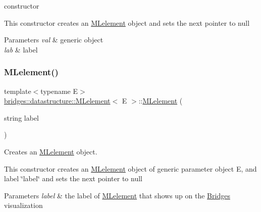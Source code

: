 constructor 

This constructor creates an \hyperlink{classbridges_1_1datastructure_1_1_m_lelement}{M\+Lelement} object and sets the next pointer to null


\begin{DoxyParams}{Parameters}
{\em val} & generic object \\
\hline
{\em lab} & label \\
\hline
\end{DoxyParams}
\mbox{\label{classbridges_1_1datastructure_1_1_m_lelement_aae22c04d644bcab2eba56bb8dc84d5eb}} 
\subsubsection{\texorpdfstring{M\+Lelement()}{MLelement()}\hspace{0.1cm}{\footnotesize\ttfamily [2/3]}}
{\footnotesize\ttfamily template$<$typename E$>$ \\
\hyperlink{classbridges_1_1datastructure_1_1_m_lelement}{bridges\+::datastructure\+::\+M\+Lelement}$<$ E $>$\+::\hyperlink{classbridges_1_1datastructure_1_1_m_lelement}{M\+Lelement} (\begin{DoxyParamCaption}\item[{string}]{label }\end{DoxyParamCaption})\hspace{0.3cm}{\ttfamily [inline]}}



Creates an \hyperlink{classbridges_1_1datastructure_1_1_m_lelement}{M\+Lelement} object. 

This constructor creates an \hyperlink{classbridges_1_1datastructure_1_1_m_lelement}{M\+Lelement} object of generic parameter object E, and label \char`\"{}label\char`\"{} and sets the next pointer to null


\begin{DoxyParams}{Parameters}
{\em label} & the label of \hyperlink{classbridges_1_1datastructure_1_1_m_lelement}{M\+Lelement} that shows up on the \hyperlink{classbridges_1_1_bridges}{Bridges} visualization \\
\hline
\end{DoxyParams}
\mbox{\label{classbridges_1_1datastructure_1_1_m_lelement_ac3349ecdbce79646839cdb9ea1e90b2f}} 
